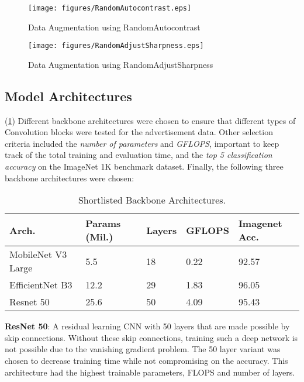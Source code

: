 \documentclass[conference]{IEEEtran}
\begin{document}
\begin{figure}[htbp] 
    \texttt{[image: figures/RandomAutocontrast.eps]} 
    \caption{Data Augmentation using RandomAutocontrast} 
    \label{fig:RandomAutocontrast}
    \end{figure}

\begin{figure}[htbp] 
    \texttt{[image: figures/RandomAdjustSharpness.eps]} 
    \caption{Data Augmentation using RandomAdjustSharpness} 
    \label{fig:RandomAdjustSharpness}
    \end{figure}
    

\subsection{Model Architectures} 
(\ref{tab:selArch}) Different backbone architectures were chosen to ensure that different 
types of Convolution blocks were tested for the advertisement data. Other selection criteria 
included the \textit{number of parameters} and \textit{GFLOPS}, important to keep track of 
the total training and evaluation time, and the \textit{top 5 classification accuracy} on the 
ImageNet 1K benchmark dataset. Finally, the following three
backbone architectures were chosen:

\begin{table}[htbp]
    \caption{Shortlisted Backbone Architectures.}
    \centering
    \begin{tabular}{p{1.5cm}|p{1cm}|p{1cm}|p{1.2cm}|p{1cm}}
    \hline
    Arch. & Params (Mil.) & Layers & GFLOPS & Imagenet Acc.\\
    \hline
    MobileNet V3 Large & 5.5 & 18 & 0.22 & 92.57\\
    \hline
    EfficientNet B3 & 12.2 & 29 & 1.83 & 96.05\\
    \hline
    Resnet 50 & 25.6 & 50 & 4.09 & 95.43\\
    \hline
    \end{tabular}
    \label{tab:selArch}
  \end{table}

\textbf{ResNet 50}: A residual learning CNN with 50 layers that  are made possible by skip connections. Without these skip  connections, training such a deep network is not possible due to the vanishing gradient problem. The 50 layer variant was chosen to decrease training time while not compromising on the accuracy. This architecture had the highest trainable parameters, FLOPS and number of layers\cite{b18}.
\end{document}
